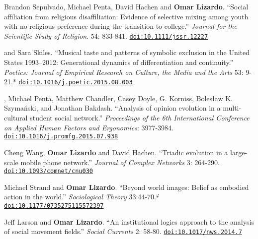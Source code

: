 
\ind Brandon Sepulvado, Michael Penta, David Hachen and {\bf Omar Lizardo}. ``Social affiliation from religious disaffiliation: Evidence of selective mixing among youth with no religious preference during the transition to college.'' {\em Journal for the Scientific Study of Religion}. 54: 833-841. \href{https://doi.org/10.1111/jssr.12227}{\nolinkurl{doi:10.1111/jssr.12227}}

 and Sara Skiles. ``Musical taste and patterns of symbolic exclusion in the United States 1993–2012: Generational dynamics of differentiation and continuity.'' {\em Poetics: Journal of Empirical Research on Culture, the Media and the Arts}  53: 9-21.\textcolor{uclablue}{*} \href{https://doi.org/10.1016/j.poetic.2015.08.003}{\nolinkurl{doi:10.1016/j.poetic.2015.08.003}}

, Michael Penta, Matthew Chandler, Casey Doyle, G. Korniss, Boles\l{}aw K. Szyma\'{n}ski, and Jonathan Bakdash. ``Analysis of opinion evolution in a multi-cultural student social network.''  {\em Proceedings of the 6th International Conference on Applied Human Factors and Ergonomics}: 3977-3984. \href{https://doi.org/10.1016/j.promfg.2015.07.938}{\nolinkurl{doi:10.1016/j.promfg.2015.07.938}}

\ind Cheng Wang, {\bf Omar Lizardo} and David Hachen. ``Triadic evolution in a large-scale mobile phone network.'' {\em Journal of Complex Networks} 3: 264-290. \href{https://doi.org/10.1093/comnet/cnu030}{\nolinkurl{doi:10.1093/comnet/cnu030}}

\ind Michael Strand and {\bf Omar Lizardo}. ``Beyond world images: Belief as embodied action in the world.'' {\em Sociological Theory} 33:44-70.\textcolor{black}{$^{\varphi}$} \href{https://doi.org/10.1177/0735275115572397}{\nolinkurl{doi:10.1177/0735275115572397}}

\ind Jeff Larson and {\bf Omar Lizardo}. ``An institutional logics approach to the analysis of social movement fields.'' {\em Social Currents} 2: 58-80. \href{https://doi.org/10.1017/nws.2014.7}{\nolinkurl{doi:10.1017/nws.2014.7}}